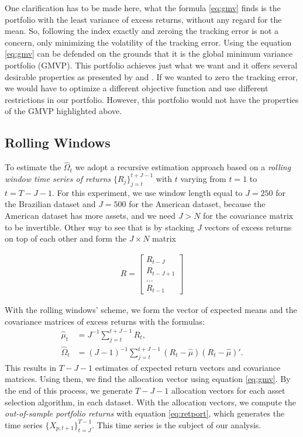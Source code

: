 \documentclass[preprint,authoryear,review,12pt]{elsarticle}
\begin{document}
One clarification has to be made here, what the formula \eqref{eq:gmv} finds is the portfolio with the least variance of excess returns, without any regard for the mean.
So, following the index exactly and zeroing the tracking error is not a concern, only minimizing the volatility of the tracking error.
Using the equation \eqref{eq:gmv} can be defended on the grounds that it is the global minimum variance portfolio (GMVP).
This portfolio achieves just what we want and it offers several desirable properties as presented by \cite{jag-2003} and \cite{CTS2006}.
If we wanted to zero the tracking error, we would have to optimize a different objective function and use different restrictions in our portfolio.
However, this portfolio would not have the properties of the GMVP highlighted above.

\subsection*{Rolling Windows}

To estimate the $\hat{\Omega}_{t}$ we adopt a recursive estimation approach based on a \textit{rolling window time series of returns} $\{R_{j}\}_{j=t}^{t+J-1}$ with $t$ varying from $t=1$ to $t=T-J-1$.
For this experiment, we use window length equal to $J=250$ for the Brazilian dataset and $J=500$ for the American dataset, because the American dataset has more assets, and we need $J>N$ for the covariance matrix to be invertible.
Other way to see that is by stacking $J$ vectors of excess returns on top of each other and form the $J \times N$ matrix 

\begin{align*}
R =
\begin{bmatrix}
	R_{t-J}	\\ R_{t-J+1} \\ \dots \\ R_{t-1}
\end{bmatrix}
\end{align*}

With the rolling windows' scheme, we form the vector of expected means and the covariance matrices of excess returns with the formulas:
\begin{align}
	\hat{\mu}_{t} &= J^{-1}\sum_{j=t}^{t+J-1} R_{t},
	\\
	\hat{\Omega}_{t} &= (J-1)^{-1} \sum_{j=t}^{t+J-1}(R_{t} - \hat{\mu})(R_{t} - \hat{\mu})'.
\end{align}
This results in $T-J-1$ estimates of expected return vectors and covariance matrices.
Using them, we find the allocation vector using equation \eqref{eq:gmv}.
By the end of this process, we generate $T-J-1$ allocation vectors for each asset selection algorithm, in each dataset.
With the allocation vectors, we compute the \textit{out-of-sample portfolio returns} with equation \eqref{eq:retport}, which generates the time series $\{X_{p,t+1}\}_{t=J}^{T-1}$.
This time series is the subject of our analysis. 
\end{document}
